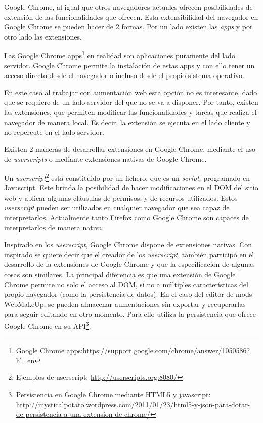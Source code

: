 Google Chrome, al igual que otros navegadores actuales ofrecen posibilidades de extensión de las funcionalidades que ofrecen. Esta extensibilidad del navegador en Google Chrome se pueden hacer de 2 formas. Por un lado existen las \emph{apps} y por otro lado las extensiones.

Las Google Chrome apps\footnote{Google Chrome apps:\url{https://support.google.com/chrome/answer/1050586?hl=en}} en realidad son aplicaciones puramente del lado servidor. Google Chrome permite la instalación de estas apps y con ello tener un acceso directo desde el navegador o incluso desde el propio sistema operativo.

En este caso al trabajar con aumentación web esta opción no es interesante, dado que se requiere de un lado servidor del que no se va a disponer. Por tanto, existen las extensiones, que permiten modificar las funcionalidades y tareas que realiza el navegador de manera local. Es decir, la extensión se ejecuta en el lado cliente y no repercute en el lado servidor.

Existen 2 maneras de desarrollar extensiones en Google Chrome, mediante el uso de \emph{userscripts} o mediante extensiones nativas de Google Chrome.

Un \emph{userscript}\footnote{Ejemplos de userscript:  \url{http://userscripts.org:8080/}} está constituido por un fichero, que es un \emph{script}, programado en Javascript. Este brinda la posibilidad de hacer modificaciones en el DOM del sitio web y aplicar algunas cláusulas de permisos, y de recursos utilizados. Estos \emph{userscript} pueden ser utilizados en cualquier navegador que sea capaz de interpretarlos. Actualmente tanto Firefox como Google Chrome son capaces de interpretarlos de manera nativa.

Inspirado en los \emph{userscript}, Google Chrome dispone de extensiones nativas. Con inspirado se quiere decir que el creador de los \emph{userscript}, también participó en el desarrollo de la extensiones de Google Chrome y que la especificación de algunas cosas son similares. La principal diferencia es que una extensión de Google Chrome permite no solo el acceso al DOM, si no a múltiples características del propio navegador (como la persistencia de datos). En el caso del editor de mods WebMakeUp, se pueden almacenar aumentaciones sin exportar y recuperarlas para seguir editando en otro momento. Para ello utiliza la persistencia que ofrece Google Chrome en su API\footnote{Persistencia en Google Chrome mediante HTML5 y javascript: \url{http://mysticalpotato.wordpress.com/2011/01/23/html5-y-json-para-dotar-de-persistencia-a-una-extension-de-chrome/}}.

